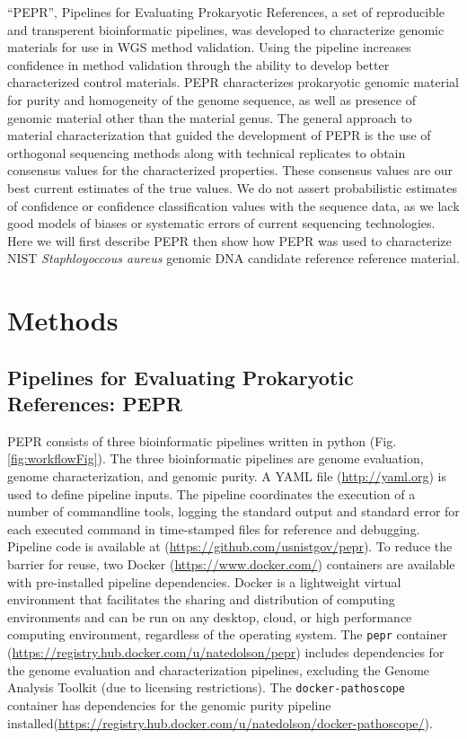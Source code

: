 \documentclass[smallextended]{svjour3}\usepackage[]{graphicx}\usepackage[]{color}
\begin{document}
“PEPR”, Pipelines for Evaluating Prokaryotic References, a set of reproducible and transperent bioinformatic pipelines, was developed to characterize genomic materials for use in WGS method validation. Using the pipeline increases confidence in method validation through the ability to develop better characterized control materials. PEPR characterizes prokaryotic genomic material for purity and homogeneity of the genome sequence, as well as presence of genomic material other than the material genus. The general approach to material characterization that guided the development of PEPR is the use of orthogonal sequencing methods along with technical replicates to obtain consensus values for the characterized properties. These consensus values are our best current estimates of the true values. We do not assert probabilistic estimates of confidence or confidence classification values with the sequence data, as we lack good models of biases or systematic errors of current sequencing technologies. Here we will first describe PEPR then show how PEPR was used to characterize NIST \textit{Staphloyoccous aureus} genomic DNA candidate reference reference material.

\section{Methods}
\subsection{Pipelines for Evaluating Prokaryotic References: PEPR}
PEPR consists of three bioinformatic pipelines written in python (Fig. \ref{fig:workflowFig}).  The three bioinformatic pipelines are genome evaluation, genome characterization, and genomic purity. A YAML file (\url{http://yaml.org}) is used to define pipeline inputs. The pipeline coordinates the execution of a number of commandline tools, logging the standard output and standard error for each executed command in time-stamped files for reference and debugging. Pipeline code is available at (\url{https://github.com/usnistgov/pepr}). To reduce the barrier for reuse, two Docker (\url{https://www.docker.com/}) containers are available with pre-installed pipeline dependencies. Docker is a lightweight virtual environment that facilitates the sharing and distribution of computing environments and can be run on any desktop, cloud, or high performance computing environment, regardless of the operating system. The \texttt{pepr} container (\url{https://registry.hub.docker.com/u/natedolson/pepr}) includes dependencies for the genome evaluation and characterization pipelines, excluding the Genome Analysis Toolkit (due to licensing restrictions). The \texttt{docker-pathoscope} container has dependencies for the genomic purity pipeline installed(\url{https://registry.hub.docker.com/u/natedolson/docker-pathoscope/}).
\end{document}
